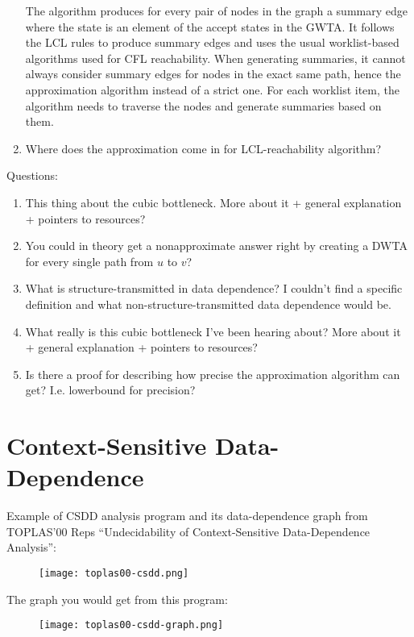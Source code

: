 \documentclass[11pt]{article}
\begin{document}
\begin{enumerate}
  The algorithm produces for every pair of nodes in the graph a summary edge where the state is an element of the accept states in the GWTA. It follows the LCL rules to produce summary edges and uses the usual worklist-based algorithms used for CFL reachability. When generating summaries, it cannot always consider summary edges for nodes in the exact same path, hence the approximation algorithm instead of a strict one. For each worklist item, the algorithm needs to traverse the nodes and generate summaries based on them.

  \item Where does the approximation come in for LCL-reachability algorithm?
\end{enumerate}

Questions:
\begin{enumerate}
  \item This thing about the cubic bottleneck. More about it + general explanation + pointers to resources?
  \item You could in theory get a nonapproximate answer right by creating a DWTA for every single path from $u$ to $v$?
  \item What is structure-transmitted in data dependence? I couldn't find a specific definition and what non-structure-transmitted data dependence would be.
  \item What really is this cubic bottleneck I've been hearing about? More about it + general explanation + pointers to resources?
  \item Is there a proof for describing how precise the approximation algorithm can get? I.e. lowerbound for precision?
\end{enumerate}

\section{Context-Sensitive Data-Dependence}
Example of CSDD analysis program and its data-dependence graph from TOPLAS'00 Reps ``Undecidability of Context-Sensitive Data-Dependence Analysis'':
\begin{figure}[h]
    \centering
    \texttt{[image: toplas00-csdd.png]}
\end{figure}

The graph you would get from this program:
\begin{figure}[h]
    \centering
    \texttt{[image: toplas00-csdd-graph.png]}
\end{figure}
\end{document}
